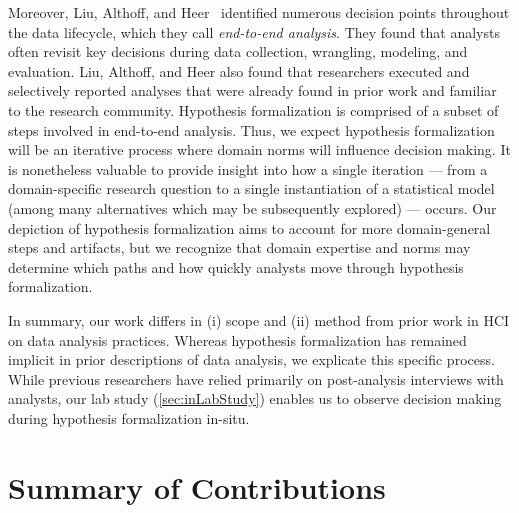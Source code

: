 Moreover, Liu, Althoff, and Heer~\cite{liu2019paths} identified numerous
decision points throughout the data lifecycle, which they call
\textit{end-to-end analysis}. They found that analysts often revisit key
decisions during data collection, wrangling, modeling, and evaluation. Liu,
Althoff, and Heer also found that researchers executed and selectively reported
analyses that were already found in prior work and familiar to the research
community. Hypothesis formalization is comprised of a subset of steps involved
in end-to-end analysis. Thus, we expect hypothesis formalization will be an
iterative process where domain norms will influence decision making. It is
nonetheless valuable to provide insight into how a single iteration --- from a
domain-specific research question to a single instantiation of a statistical
model (among many alternatives which may be subsequently explored) --- occurs.
Our depiction of hypothesis formalization aims to account for more
domain-general steps and artifacts, but we recognize that domain expertise and
norms may determine which paths and how quickly analysts move through hypothesis
formalization.

In summary, our work differs in (i) scope and (ii) method from prior work in HCI
on data analysis practices. Whereas hypothesis formalization has remained
implicit in prior descriptions of data analysis, we explicate
this specific process. While previous researchers have relied primarily on
post-analysis interviews with analysts, our lab study (\autoref{sec:inLabStudy}) enables us to observe
decision making during hypothesis formalization in-situ.











\section{Summary of Contributions}
